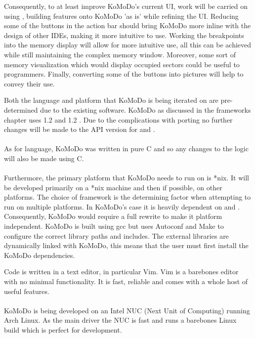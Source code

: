     Consequently, to at least improve KoMoDo's current UI, work will be carried on using , building features onto KoMoDo 'as is' while refining the UI. Reducing some of the buttons in the action bar should bring KoMoDo more inline with the design of other IDEs, making it more intuitive to use. Working the breakpoints into the memory display will allow for more intuitive use, all this can be achieved while still maintaining the complex memory window. Moreover, some sort of memory visualization which would display occupied sectors could be useful to programmers. Finally, converting some of the buttons into pictures will help to convey their use.

  Both the language and platform that KoMoDo is being iterated on are pre-determined due to the existing software. KoMoDo as discussed in the frameworks chapter uses  1.2 and  1.2 . Due to the complications with porting no further changes will be made to the API version for  and .\\\\
  As for language, KoMoDo was written in pure C and so any changes to the logic will also be made using C.\\\\
  Furthermore, the primary platform that KoMoDo needs to run on is *nix. It will be developed primarily on a *nix machine and then if possible, on other platforms. The choice of framework is the determining factor when attempting to run on multiple platforms. In KoMoDo's case it is heavily dependent on  and . Consequently, KoMoDo would require a full rewrite to make it platform independent.
  KoMoDo is built using gcc but uses Autoconf and Make to configure the correct library paths and includes. The external libraries are dynamically linked with KoMoDo, this means that the user must first install the KoMoDo dependencies.

  Code is written in a text editor, in particular Vim. Vim is a barebones editor with no minimal functionality. It is fast, reliable and comes with a whole host of useful features.\\\\
  KoMoDo is being developed on an Intel NUC (Next Unit of Computing) running Arch Linux. As the main driver the NUC is fast and runs a barebones Linux build which is perfect for development.

